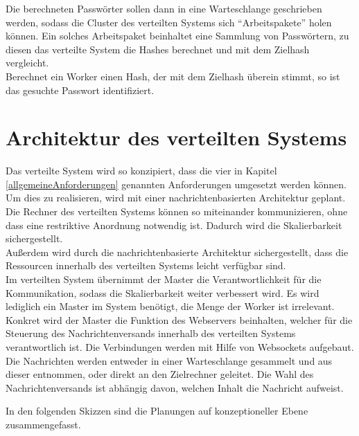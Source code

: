 Die berechneten Passwörter sollen dann in eine Warteschlange geschrieben werden, sodass die Cluster des verteilten Systems sich \enquote{Arbeitspakete} holen können. Ein solches Arbeitspaket beinhaltet eine Sammlung von Passwörtern, zu diesen das verteilte System die Hashes berechnet und mit dem Zielhash vergleicht.\\
 Berechnet ein Worker einen Hash, der mit dem Zielhash überein stimmt, so ist das gesuchte Passwort identifiziert.  


\section{Architektur des verteilten Systems}
Das verteilte System wird so konzipiert, dass die vier in Kapitel \ref{allgemeineAnforderungen} genannten Anforderungen umgesetzt werden können. Um dies zu realisieren, wird mit einer nachrichtenbasierten Architektur geplant. Die Rechner des verteilten Systems können so miteinander kommunizieren, ohne dass eine restriktive Anordnung notwendig ist. Dadurch wird die Skalierbarkeit sichergestellt. \\
Außerdem wird durch die nachrichtenbasierte Architektur sichergestellt, dass die Ressourcen innerhalb des verteilten Systems leicht verfügbar sind. \\
Im verteilten System übernimmt der Master die Verantwortlichkeit für die Kommunikation, sodass die Skalierbarkeit weiter verbessert wird. Es wird lediglich ein Master im System benötigt, die Menge der Worker ist irrelevant. Konkret wird der Master die Funktion des Webservers beinhalten, welcher für die Steuerung des Nachrichtenversands innerhalb des verteilten Systems verantwortlich ist. Die Verbindungen werden mit Hilfe von Websockets aufgebaut.\\
Die Nachrichten werden entweder in einer Warteschlange gesammelt und aus dieser entnommen, oder direkt an den Zielrechner geleitet. Die Wahl des Nachrichtenversands ist abhängig davon, welchen Inhalt die Nachricht aufweist.

In den folgenden Skizzen sind die Planungen auf konzeptioneller Ebene zusammengefasst.


